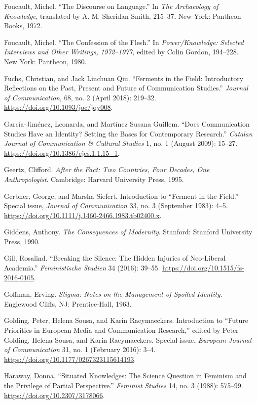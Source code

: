 \documentclass{tufte-handout}
\begin{document}
\begin{hangparas}{.25in}{1}
Foucault, Michel. ``The Discourse on Language.'' In \emph{The
Archaeology of Knowledge}, translated by A. M. Sheridan Smith,
215--37\emph{.} New York: Pantheon Books, 1972.

Foucault, Michel. ``The Confession of the Flesh.'' In
\emph{Power/Knowledge: Selected Interviews and Other Writings,
1972--1977,} edited by Colin Gordon, 194--228. New York: Pantheon, 1980.

Fuchs, Christian, and Jack Linchuan Qiu. ``Ferments in the Field:
Introductory Reflections on the Past, Present and Future of
Communication Studies.'' \emph{Journal of Communication}, 68, no. 2
(April 2018): 219--32. \url{https://doi.org/10.1093/joc/jqy008}.

García-Jiménez, Leonarda, and Martínez Susana Guillem. ``Does
Communication Studies Have an Identity? Setting the Bases for
Contemporary Research.'' \emph{Catalan Journal of Communication \&
Cultural Studies} 1, no. 1 (August 2009): 15--27.
\url{https://doi.org/10.1386/cjcs.1.1.15_1}.

Geertz, Clifford. \emph{After the Fact: Two Countries, Four Decades, One
Anthropologist}. Cambridge: Harvard University Press, 1995.

Gerbner, George, and Marsha Siefert. Introduction to ``Ferment in the
Field.'' Special issue, \emph{Journal of Communication} 33, no. 3
(September 1983): 4--5.
\url{https://doi.org/10.1111/j.1460-2466.1983.tb02400.x}.

Giddens, Anthony. \emph{The Consequences of Modernity}. Stanford:
Stanford University Press, 1990.

Gill, Rosalind. ``Breaking the Silence: The Hidden Injuries of
Neo-Liberal Academia.'' \emph{Feministische Studien} 34 (2016): 39--55.
\url{https://doi.org/10.1515/fs-2016-0105}.

Goffman, Erving. \emph{Stigma: Notes on the Management of Spoiled
Identity}. Englewood Cliffs, NJ: Prentice-Hall, 1963.

Golding, Peter, Helena Sousa, and Karin Raeymaeckers. Introduction to
``Future Priorities in European Media and Communication Research,''
edited by Peter Golding, Helena Sousa, and Karin Raeymaeckers. Special
issue, \emph{European Journal of Communication} 31, no. 1 (February
2016): 3--4. \url{https://doi.org/10.1177/0267323115614193}.

Haraway, Donna. ``Situated Knowledges: The Science Question in Feminism
and the Privilege of Partial Perspective.'' \emph{Feminist Studies} 14,
no. 3 (1988): 575--99. \url{https://doi.org/10.2307/3178066}.


\end{hangparas}
\end{document}
